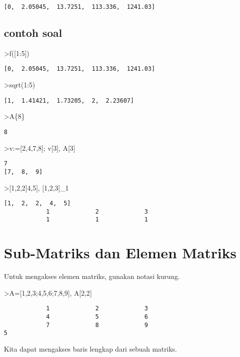 \documentclass[
]{book}
\begin{document}
\begin{verbatim}
[0,  2.05045,  13.7251,  113.336,  1241.03]
\end{verbatim}

\section{contoh soal}\label{contoh-soal-11}

\textgreater f({[}1:5{]})

\begin{verbatim}
[0,  2.05045,  13.7251,  113.336,  1241.03]
\end{verbatim}

\textgreater sqrt(1:5)

\begin{verbatim}
[1,  1.41421,  1.73205,  2,  2.23607]
\end{verbatim}

\textgreater A\{8\}

\begin{verbatim}
8
\end{verbatim}

\textgreater v:={[}2,4,7,8{]}; v{[}3{]}, A{[}3{]}

\begin{verbatim}
7
[7,  8,  9]
\end{verbatim}

\textgreater{[}1,2,2{]}\textbar{[}4,5{]}, {[}1,2,3{]}\_1

\begin{verbatim}
[1,  2,  2,  4,  5]
            1             2             3 
            1             1             1 
\end{verbatim}

\chapter{Sub-Matriks dan Elemen Matriks}\label{sub-matriks-dan-elemen-matriks}

Untuk mengakses elemen matriks, gunakan notasi kurung.

\textgreater A={[}1,2,3;4,5,6;7,8,9{]}, A{[}2,2{]}

\begin{verbatim}
            1             2             3 
            4             5             6 
            7             8             9 
5
\end{verbatim}

Kita dapat mengakses baris lengkap dari sebuah matriks.
\end{document}
